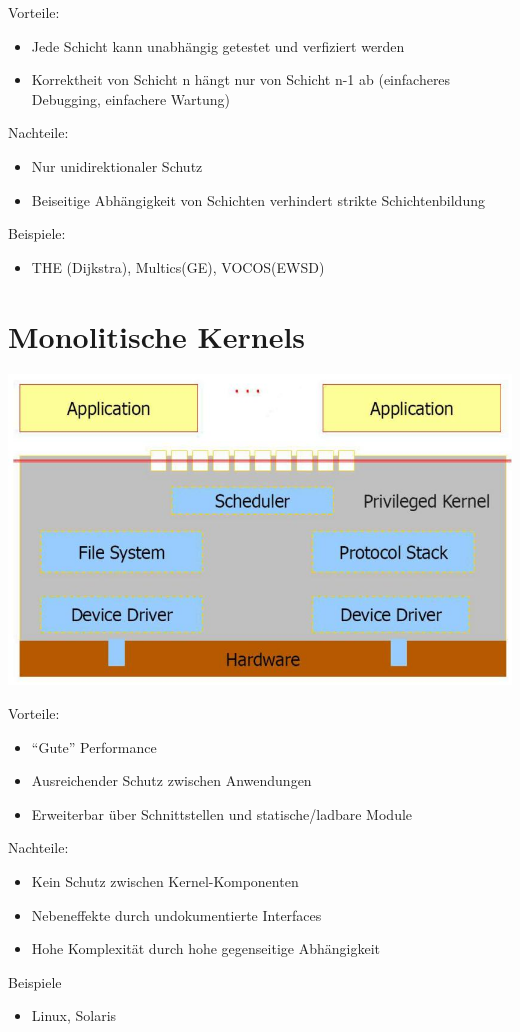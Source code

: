 \documentclass[a4paper]{scrreprt}
\begin{document}
Vorteile:
	\begin{itemize}
		\item Jede Schicht kann unabhängig getestet und verfiziert werden
		\item Korrektheit von Schicht n hängt nur von Schicht n-1 ab (einfacheres Debugging, einfachere Wartung)
	\end{itemize}

Nachteile:
	\begin{itemize}
		\item Nur unidirektionaler Schutz
		\item Beiseitige Abhängigkeit von Schichten verhindert strikte Schichtenbildung
	\end{itemize}
Beispiele:
	\begin{itemize}
		\item THE (Dijkstra), Multics(GE), VOCOS(EWSD)
	\end{itemize}
	
\section{Monolitische Kernels}
	\begin{center}
		\includegraphics[scale=0.3]{graphics/monolithickernel.png}
	\end{center}
	Vorteile:
		\begin{itemize}
			\item "`Gute"' Performance
			\item Ausreichender Schutz zwischen Anwendungen
			\item Erweiterbar über Schnittstellen und statische/ladbare Module
		\end{itemize}
	Nachteile:
		\begin{itemize}
			\item Kein Schutz zwischen Kernel-Komponenten
			\item Nebeneffekte durch undokumentierte Interfaces
			\item Hohe Komplexität durch hohe gegenseitige Abhängigkeit
		\end{itemize}
	Beispiele
		\begin{itemize}
			\item Linux, Solaris
		\end{itemize}
\end{document}
